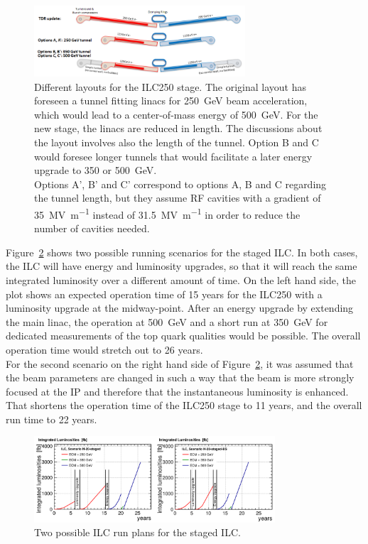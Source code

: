 \begin{figure}[H]
\centering
\includegraphics[width=0.7\textwidth]{Figures/Staging.png}
\caption[Different layouts for the ILC250 stage]{Different layouts for the ILC250 stage.
The original layout has foreseen a tunnel fitting linacs for \SI{250}{\GeV} beam acceleration, which would lead to a center-of-mass energy of \SI{500}{\GeV}.
For the new stage, the linacs are reduced in length.
The discussions about the layout involves also the length of the tunnel.
Option B and C would foresee longer tunnels that would facilitate a later energy upgrade to 350 or \SI{500}{\GeV}.\\
Options A', B' and C' correspond to options A, B and C regarding the tunnel length, but they assume RF cavities with a gradient of \SI{35}{\mega\volt\per\meter} instead of \SI{31.5}{\mega\volt\per\meter} in order to reduce the number of cavities needed.~\cite[p. 19]{Staging}}
\label{fig:Staging}
\end{figure}
Figure~\ref{fig:ILC_runningtime} shows two possible running scenarios for the staged ILC.
In both cases, the ILC will have energy and luminosity upgrades, so that it will reach the same integrated luminosity over a different amount of time.
On the left hand side, the plot shows an expected operation time of 15 years for the ILC250 with a luminosity upgrade at the midway-point.
After an energy upgrade by extending the main linac, the operation at \SI{500}{\GeV} and a short run at \SI{350}{\GeV} for dedicated measurements of the top quark qualities would be possible.
The overall operation time would stretch out to 26 years.\\
For the second scenario on the right hand side of Figure~\ref{fig:ILC_runningtime}, it was assumed that the beam parameters are changed in such a way that the beam is more strongly focused at the IP and therefore that the instantaneous luminosity is enhanced.
That shortens the operation time of the ILC250 stage to 11 years, and the overall run time to 22 years.~\cite[p. 7]{PhysicsCase}
\begin{figure}[h]
\centering
\includegraphics[width=0.8\textwidth]{Figures/ILC_runningtime.png}
\caption[ILC run plan]{Two possible ILC run plans for the staged ILC.~\cite[p. 8]{PhysicsCase}}
\label{fig:ILC_runningtime}
\end{figure}
\newpage
